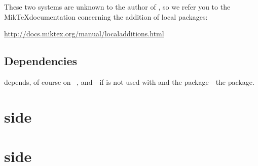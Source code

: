 \documentclass[english]{ltxdoc}
\begin{document}
These two systems are unknown to the author of \wordcloudpkg, so we
refer you to the Mik\TeX documentation concerning the addition of local packages:
\begin{center}
  \url{http://docs.miktex.org/manual/localadditions.html}
\end{center}



\subsection{Dependencies}


\wordcloudpkg depends, of course on \MP~\cite{ctan-metapost}, and---if \wordcloudpkg
is not used with  and the  package---the
 package. 

\section{ side}

\section{ side}
\end{document}
